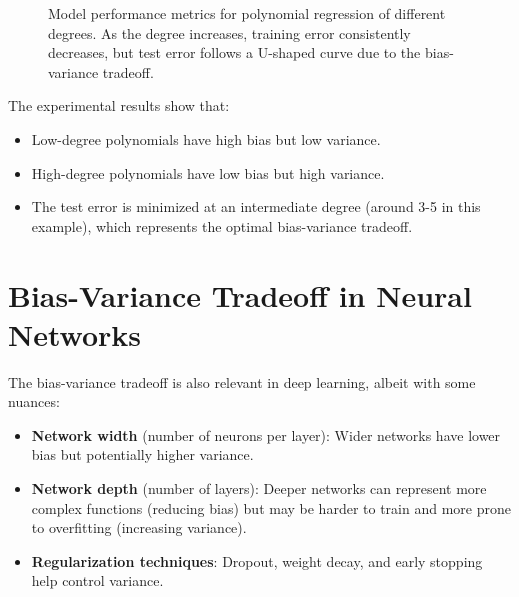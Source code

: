 \documentclass{article}
\begin{document}
\begin{figure}[h]
\centering
{}
\caption{Model performance metrics for polynomial regression of different degrees. As the degree increases, training error consistently decreases, but test error follows a U-shaped curve due to the bias-variance tradeoff.}
\end{figure}

The experimental results show that:
\begin{itemize}
\item Low-degree polynomials have high bias but low variance.
\item High-degree polynomials have low bias but high variance.
\item The test error is minimized at an intermediate degree (around 3-5 in this example), which represents the optimal bias-variance tradeoff.
\end{itemize}

\section{Bias-Variance Tradeoff in Neural Networks}

The bias-variance tradeoff is also relevant in deep learning, albeit with some nuances:

\begin{itemize}
\item \textbf{Network width} (number of neurons per layer): Wider networks have lower bias but potentially higher variance.
\item \textbf{Network depth} (number of layers): Deeper networks can represent more complex functions (reducing bias) but may be harder to train and more prone to overfitting (increasing variance).
\item \textbf{Regularization techniques}: Dropout, weight decay, and early stopping help control variance.
\end{itemize}
\end{document}
